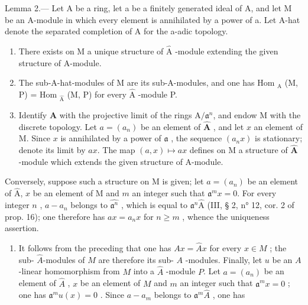 Lemma 2.--- Let A be a ring, let a be a finitely generated ideal of A, and let M be an A-module in which every element is annihilated by a power of a. Let A-hat denote the separated completion of A for the a-adic topology.

\begin{enumerate}
\def\labelenumi{\alph{enumi})}
\item
  There exists on M a unique structure of \(\widehat{\mathrm{A}}\) -module extending the given structure of A-module.
\item
  The sub-A-hat-modules of M are its sub-A-modules, and one has Hom \(_{\text{A}}\) (M, P) = Hom \(_{\widehat{\text{A}}}\) (M, P) for every \(\widehat{\text{A}}\) -module P.
\item
  Identify \(\widehat{\mathbf{A}}\) with the projective limit of the rings \(\mathrm{A} / \mathfrak{a}^n\), and endow M with the discrete topology. Let \(a = (a_n)\) be an element of \(\widehat{\mathbf{A}}\) , and let \(x\) an element of M. Since \(x\) is annihilated by a power of \(\mathfrak{a}\) , the sequence \((a_n x)\) is stationary; denote its limit by \(ax\). The map \((a, x) \mapsto ax\) defines on M a structure of \(\widehat{\mathbf{A}}\) -module which extends the given structure of A-module.
\end{enumerate}

Conversely, suppose such a structure on M is given; let \(a = (a_{n})\) be an element of \(\widehat{\mathrm{A}}\), \(x\) be an element of M and \(m\) an integer such that \(\mathfrak{a}^{m}x = 0\). For every integer \(n\) , \(a - a_{n}\) belongs to \(\widehat{\mathfrak{a}^{n}}\) , which is equal to \(\mathfrak{a}^{n}\widehat{\mathrm{A}}\) (III, § 2, n° 12, cor. 2 of prop. 16); one therefore has \(ax = a_{n}x\) for \(n \geqslant m\) , whence the uniqueness assertion.

\begin{enumerate}
\def\labelenumi{\alph{enumi})}
\setcounter{enumi}{1}
\tightlist
\item
  It follows from the preceding that one has \(Ax = \widehat{A}x\) for every \(x \in M\) ; the sub- \(\widehat{A}\)-modules of \(M\) are therefore its sub- \(A\) -modules. Finally, let \(u\) be an \(A\)-linear homomorphism from \(M\) into a \(\widehat{A}\) -module \(P\). Let \(a = (a_n)\) be an element of \(\widehat{A}\) , \(x\) be an element of \(M\) and \(m\) an integer such that \(\mathfrak{a}^m x = 0\) ; one has \(\mathfrak{a}^m u(x) = 0\) . Since \(a - a_m\) belongs to \(\mathfrak{a}^m\widehat{A}\) , one has
\end{enumerate}

